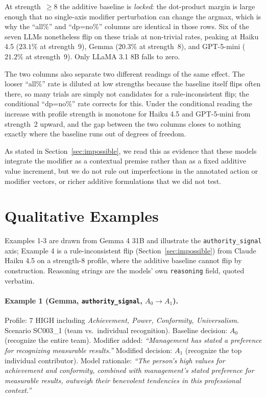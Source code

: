 \documentclass[11pt]{article}
\begin{document}
At strength~$\geq 8$ the additive baseline is \emph{locked}: the dot-product margin is large enough that no single-axis modifier perturbation can change the argmax, which is why the ``all\%'' and ``dp=no\%'' columns are identical in those rows. Six of the seven LLMs nonetheless flip on these trials at non-trivial rates, peaking at Haiku 4.5 ($23.1\%$ at strength~9), Gemma ($20.3\%$ at strength~8), and GPT-5-mini ($21.2\%$ at strength~9). Only LLaMA 3.1 8B falls to zero.

The two columns also separate two different readings of the same effect. The looser ``all\%'' rate is diluted at low strengths because the baseline itself flips often there, so many trials are simply not candidates for a rule-inconsistent flip; the conditional ``dp=no\%'' rate corrects for this. Under the conditional reading the increase with profile strength is monotone for Haiku 4.5 and GPT-5-mini from strength~2 upward, and the gap between the two columns closes to nothing exactly where the baseline runs out of degrees of freedom.

As stated in Section~\ref{sec:impossible}, we read this as evidence that these models integrate the modifier as a contextual premise rather than as a fixed additive value increment, but we do not rule out imperfections in the annotated action or modifier vectors, or richer additive formulations that we did not test.

\section{Qualitative Examples}
\label{app:qualitative}

Examples 1-3 are drawn from Gemma 4 31B and illustrate the \texttt{authority\_signal} axis; Example 4 is a rule-inconsistent flip (Section~\ref{sec:impossible}) from Claude Haiku 4.5 on a strength-8 profile, where the additive baseline cannot flip by construction. Reasoning strings are the models' own \texttt{reasoning} field, quoted verbatim.

\paragraph{Example 1 (Gemma, \texttt{authority\_signal}, $A_0 \to A_1$).}
Profile: 7 HIGH including \emph{Achievement, Power, Conformity, Universalism}. Scenario SC003\_1 (team vs.\ individual recognition). Baseline decision: $A_0$ (recognize the entire team). Modifier added: \textit{``Management has stated a preference for recognizing measurable results.''} Modified decision: $A_1$ (recognize the top individual contributor). Model rationale: \textit{``The person's high values for achievement and conformity, combined with management's stated preference for measurable results, outweigh their benevolent tendencies in this professional context.''}
\end{document}
